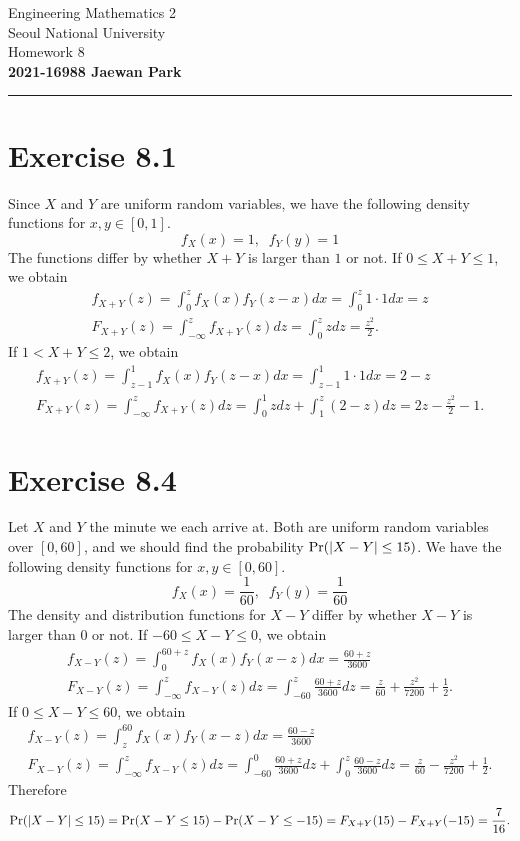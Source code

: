 \documentclass{article}
\begin{document}
\vspace*{-1.5cm}
{\centering \vbox{%
\vspace{2mm}
\large
Engineering Mathematics 2 \hfill
\\
Seoul National University
\\[4mm]
Homework 8 \\
\textbf{2021-16988 Jaewan Park} \\[0.8mm]
}}
\par\noindent\rule{\textwidth}{0.5pt}

\section*{Exercise 8.1}
Since $X$ and $Y$ are uniform random variables, we have the following density functions for $x, y \in [0, 1]$. 
$$f_X(x) = 1, \;\; f_Y(y) = 1$$
The functions differ by whether $X+Y$ is larger than $1$ or not.
If $0 \leq X+Y \leq 1$, we obtain
\begin{gather*}
    f_{X+Y}(z) = \int_{0}^{z}f_X(x)f_Y(z-x)dx = \int_{0}^{z} 1 \cdot 1 dx = z \\
    F_{X+Y}(z) = \int_{-\infty}^{z}f_{X+Y}(z)dz = \int_{0}^{z}zdz = \frac{z^2}{2}.
\end{gather*}
If $1 < X+Y \leq 2$, we obtain
\begin{gather*}
    f_{X+Y}(z) = \int_{z-1}^{1}f_X(x)f_Y(z-x)dx = \int_{z-1}^{1} 1 \cdot 1 dx = 2 - z \\
    F_{X+Y}(z) = \int_{-\infty}^{z}f_{X+Y}(z)dz = \int_{0}^{1}zdz + \int_{1}^{z}(2-z)dz = 2z - \frac{z^2}{2} - 1.
\end{gather*}

\section*{Exercise 8.4}
Let $X$ and $Y$ the minute we each arrive at. 
Both are uniform random variables over $[0, 60]$, and we should find the probability $\mathrm{Pr}\qty(\qty|X-Y| \leq 15)$.
We have the following density functions for $x, y \in [0, 60]$. 
$$f_X(x) = \frac{1}{60}, \;\; f_Y(y) = \frac{1}{60}$$
The density and distribution functions for $X-Y$ differ by whether $X-Y$ is larger than $0$ or not.
If $-60 \leq X-Y \leq 0$, we obtain
\begin{gather*}
    f_{X-Y}(z) = \int_{0}^{60+z}f_X(x)f_Y(x-z)dx = \frac{60+z}{3600} \\
    F_{X-Y}(z) = \int_{-\infty}^{z}f_{X-Y}(z)dz = \int_{-60}^{z}\frac{60+z}{3600}dz = \frac{z}{60} + \frac{z^2}{7200} + \frac{1}{2}.
\end{gather*}
If $0 \leq X-Y \leq 60$, we obtain
\begin{gather*}
    f_{X-Y}(z) = \int_{z}^{60}f_X(x)f_Y(x-z)dx = \frac{60-z}{3600} \\
    F_{X-Y}(z) = \int_{-\infty}^{z}f_{X-Y}(z)dz = \int_{-60}^{0}\frac{60+z}{3600}dz + \int_{0}^{z}\frac{60-z}{3600}dz = \frac{z}{60} - \frac{z^2}{7200} + \frac{1}{2}.
\end{gather*}
Therefore 
$$\mathrm{Pr}\qty(\qty|X-Y| \leq 15) = \mathrm{Pr}\qty(X-Y \leq 15) - \mathrm{Pr}\qty(X-Y \leq -15) = F_{X+Y}(15) - F_{X+Y}(-15) = \frac{7}{16}.$$
\end{document}
